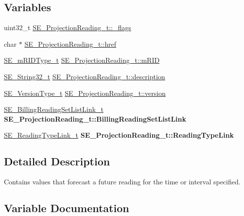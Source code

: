 \subsection*{Variables}
\begin{DoxyCompactItemize}
\item 
uint32\+\_\+t \hyperlink{group__ProjectionReading_gaff70df5c83ad6c8c2861bea87128fbba}{S\+E\+\_\+\+Projection\+Reading\+\_\+t\+::\+\_\+flags}
\item 
char $\ast$ \hyperlink{group__ProjectionReading_ga2a1bf4a686ac027eb065f8a952f3f3c2}{S\+E\+\_\+\+Projection\+Reading\+\_\+t\+::href}
\item 
\hyperlink{group__mRIDType_gac74622112f3a388a2851b2289963ba5e}{S\+E\+\_\+m\+R\+I\+D\+Type\+\_\+t} \hyperlink{group__ProjectionReading_gacc942df214770665bc45618a06255c93}{S\+E\+\_\+\+Projection\+Reading\+\_\+t\+::m\+R\+ID}
\item 
\hyperlink{group__String32_gac9f59b06b168b4d2e0d45ed41699af42}{S\+E\+\_\+\+String32\+\_\+t} \hyperlink{group__ProjectionReading_ga51e901325d458cbd9963ef99e10fbefe}{S\+E\+\_\+\+Projection\+Reading\+\_\+t\+::description}
\item 
\hyperlink{group__VersionType_ga4b8d27838226948397ed99f67d46e2ae}{S\+E\+\_\+\+Version\+Type\+\_\+t} \hyperlink{group__ProjectionReading_ga5fdacfc135d427a7e68c07a75ad546d6}{S\+E\+\_\+\+Projection\+Reading\+\_\+t\+::version}
\item 
\mbox{\label{group__ProjectionReading_ga8b60dc77eccf8946f80750a35c0efb5b}} 
\hyperlink{structSE__BillingReadingSetListLink__t}{S\+E\+\_\+\+Billing\+Reading\+Set\+List\+Link\+\_\+t} {\bfseries S\+E\+\_\+\+Projection\+Reading\+\_\+t\+::\+Billing\+Reading\+Set\+List\+Link}
\item 
\mbox{\label{group__ProjectionReading_ga327213af2ede4d135627bdc43939699b}} 
\hyperlink{structSE__ReadingTypeLink__t}{S\+E\+\_\+\+Reading\+Type\+Link\+\_\+t} {\bfseries S\+E\+\_\+\+Projection\+Reading\+\_\+t\+::\+Reading\+Type\+Link}
\end{DoxyCompactItemize}


\subsection{Detailed Description}
Contains values that forecast a future reading for the time or interval specified. 

\subsection{Variable Documentation}
\mbox{\label{group__ProjectionReading_gaff70df5c83ad6c8c2861bea87128fbba}} 
